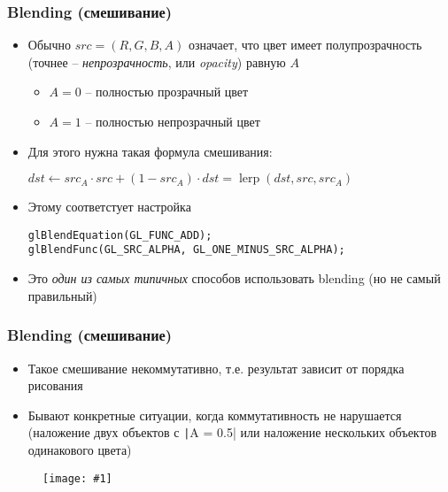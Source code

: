 \documentclass[10pt]{beamer}
\newcommand{\slideimage}[1]{
  \begin{figure}
    \begin{adjustbox}{width=\textwidth, totalheight=\textheight-2\baselineskip-2\baselineskip,keepaspectratio}
      \texttt{[image: \#1]}
    \end{adjustbox}
  \end{figure}
}
\begin{document}
\begin{frame}[fragile]
\frametitle{Blending (смешивание)}
\begin{itemize}
\item Обычно \begin{math}src=(R,G,B,A)\end{math} означает, что цвет имеет полупрозрачность (точнее -- \textit{непрозрачность}, или \textit{opacity}) равную \begin{math}A\end{math}
\begin{itemize}
\item \begin{math}A=0\end{math} -- полностью прозрачный цвет
\item \begin{math}A=1\end{math} -- полностью непрозрачный цвет
\end{itemize}
\pause
\item Для этого нужна такая формула смешивания:
\begin{center}
\begin{math}
dst \leftarrow src_A \cdot src + (1 - src_A) \cdot dst = \operatorname{lerp}(dst, src, src_A)
\end{math}
\end{center}
\pause
\item Этому соответстует настройка
\begin{verbatim}
glBlendEquation(GL_FUNC_ADD);
glBlendFunc(GL_SRC_ALPHA, GL_ONE_MINUS_SRC_ALPHA);
\end{verbatim}
\pause
\item Это \textit{один из самых типичных} способов использовать blending (но не самый правильный)
\end{itemize}
\end{frame}

\begin{frame}[fragile]
\frametitle{Blending (смешивание)}
\begin{itemize}
\item Такое смешивание некоммутативно, т.е. результат зависит от порядка рисования
\item Бывают конкретные ситуации, когда коммутативность не нарушается (наложение двух объектов с \texttt|A = 0.5| или наложение нескольких объектов одинакового цвета)
\end{itemize}
\slideimage{two-squares.png}
\end{frame}
\end{document}
